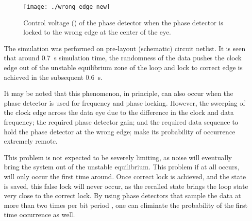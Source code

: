 \documentclass[journal,twoside,letterpaper]{IEEEtran}
\begin{document}
\begin{figure}[h!]
\centering
{}
\texttt{[image: ./wrong\_edge\_new]}
\caption{Control voltage () of the phase detector when the phase detector is locked
to the wrong edge at the center of the eye.}
\label{fig:Alex_wrong_edge}
\end{figure}

The
simulation was performed on pre-layout (schematic) circuit netlist. It is seen that
around \mbox{0.7 s} simulation time, the randomness of the data pushes the clock edge out
of the unstable equilibrium zone of the loop and lock to correct edge is achieved in the subsequent
\mbox{0.6 s.}

It may be noted that this phenomenon, in principle, can also occur when the phase detector
is used for frequency and phase locking. However, the sweeping of the clock edge across the
data eye due to the difference in the clock and data frequency; the required phase detector gain; and the required data sequence
to hold the phase detector at the wrong edge; make its probability of occurrence extremely remote.

This problem is not expected to be severely limiting, as noise will eventually
bring the system out of the unstable equilibrium. This problem if at all
occurs, will only occur the first time around. Once correct lock
is achieved, and the state is saved, this false lock will never occur,
as the recalled state brings the loop state very close to the correct lock.
By using phase detectors that sample the data at more than two times per bit
period \cite{oversampling_pd}, one can eliminate the probability of the first
time occurrence as well.



\end{document}
